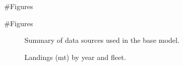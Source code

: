 \documentclass[
]{scrartcl}
\begin{document}
\newpage{}

\#Figures

\#Figures

\begin{figure}


\caption{\label{fig-data}Summary of data sources used in the base
model.}

\end{figure}%

\begin{figure}


\caption{\label{fig-catch}Landings (mt) by year and fleet.}

\end{figure}%
\end{document}
